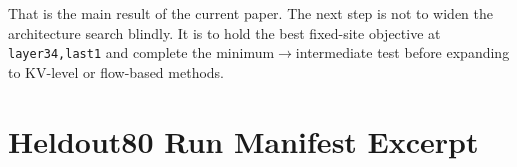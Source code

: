 \documentclass[11pt]{article}
\newcommand{\method}[1]{\texttt{#1}}
\begin{document}
That is the main result of the current paper. The next step is not to widen the architecture search blindly. It is to hold the best fixed-site objective at \method{layer34,last1} and complete the minimum$\rightarrow$intermediate test before expanding to KV-level or flow-based methods.




\appendix
\section{Heldout80 Run Manifest Excerpt}
\label{app:runlog}
\begin{table}[H]
    \centering
    \small
    \begin{minipage}{0.95\linewidth}
        
    \end{minipage}
    \caption{Manifest excerpt for the completed heldout80 validation run.}
\end{table}
\end{document}
